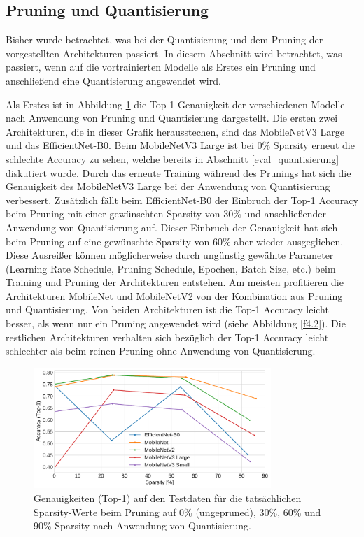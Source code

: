 \subsection{Pruning und Quantisierung}
Bisher wurde betrachtet, was bei der Quantisierung und dem Pruning der vorgestellten Architekturen passiert. In diesem Abschnitt wird betrachtet, was passiert, wenn auf die vortrainierten Modelle als Erstes ein Pruning und anschließend eine Quantisierung angewendet wird.

Als Erstes ist in Abbildung \ref{f4.4} die Top-1 Genauigkeit der verschiedenen Modelle nach Anwendung von Pruning und Quantisierung dargestellt. Die ersten zwei Architekturen, die in dieser Grafik herausstechen, sind das MobileNetV3 Large und das EfficientNet-B0. Beim MobileNetV3 Large ist bei $0\%$ Sparsity erneut die schlechte Accuracy zu sehen, welche bereits in Abschnitt \ref{eval_quantisierung} diskutiert wurde. Durch das erneute Training während des Prunings hat sich die Genauigkeit des MobileNetV3 Large bei der Anwendung von Quantisierung verbessert. Zusätzlich fällt beim EfficientNet-B0 der Einbruch der Top-1 Accuracy beim Pruning mit einer gewünschten Sparsity von $30\%$ und anschließender Anwendung von Quantisierung auf. Dieser Einbruch der Genauigkeit hat sich beim Pruning auf eine gewünschte Sparsity von $60\%$ aber wieder ausgeglichen. Diese Ausreißer können möglicherweise durch ungünstig gewählte Parameter (Learning Rate Schedule, Pruning Schedule, Epochen, Batch Size, etc.) beim Training und Pruning der Architekturen entstehen. Am meisten profitieren die Architekturen MobileNet und MobileNetV2 von der Kombination aus Pruning und Quantisierung. Von beiden Architekturen ist die Top-1 Accuracy leicht besser, als wenn nur ein Pruning angewendet wird (siehe Abbildung \ref{f4.2}). Die restlichen Architekturen verhalten sich bezüglich der Top-1 Accuracy leicht schlechter als beim reinen Pruning ohne Anwendung von Quantisierung.

\begin{figure}[htbp]
\centerline{\includegraphics[width=0.8\textwidth]{content/images/sparsity_vs_accuracy_quantized.pdf}}
\caption{Genauigkeiten (Top-1) auf den Testdaten für die tatsächlichen Sparsity-Werte beim Pruning auf 0\% (ungepruned), 30\%, 60\% und 90\% Sparsity nach Anwendung von Quantisierung.}
\label{f4.4}
\end{figure}

